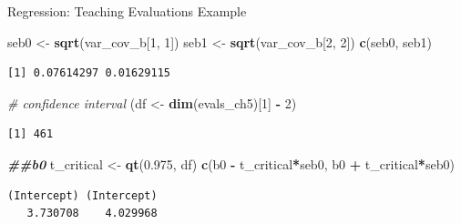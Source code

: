 \documentclass[
  ignorenonframetext,
]{beamer}
\newenvironment{Shaded}{\begin{snugshade}}{\end{snugshade}}
\newcommand{\CommentTok}[1]{\textcolor[rgb]{0.56,0.35,0.01}{\textit{#1}}}
\newcommand{\DecValTok}[1]{\textcolor[rgb]{0.00,0.00,0.81}{#1}}
\newcommand{\DocumentationTok}[1]{\textcolor[rgb]{0.56,0.35,0.01}{\textbf{\textit{#1}}}}
\newcommand{\FloatTok}[1]{\textcolor[rgb]{0.00,0.00,0.81}{#1}}
\newcommand{\FunctionTok}[1]{\textcolor[rgb]{0.13,0.29,0.53}{\textbf{#1}}}
\newcommand{\NormalTok}[1]{#1}
\newcommand{\OtherTok}[1]{\textcolor[rgb]{0.56,0.35,0.01}{#1}}
\newcommand{\SpecialCharTok}[1]{\textcolor[rgb]{0.81,0.36,0.00}{\textbf{#1}}}
\begin{document}
\begin{frame}[fragile]{Regression: Teaching Evaluations Example}
\label{regression-teaching-evaluations-example-11}
\normalsize

\begin{Shaded}
\begin{Highlighting}[]
\NormalTok{seb0 }\OtherTok{\textless{}{-}} \FunctionTok{sqrt}\NormalTok{(var\_cov\_b[}\DecValTok{1}\NormalTok{, }\DecValTok{1}\NormalTok{])}
\NormalTok{seb1 }\OtherTok{\textless{}{-}} \FunctionTok{sqrt}\NormalTok{(var\_cov\_b[}\DecValTok{2}\NormalTok{, }\DecValTok{2}\NormalTok{])}
\FunctionTok{c}\NormalTok{(seb0, seb1)}
\end{Highlighting}
\end{Shaded}

\begin{verbatim}
[1] 0.07614297 0.01629115
\end{verbatim}

\begin{Shaded}
\begin{Highlighting}[]
\CommentTok{\# confidence interval}
\NormalTok{(df }\OtherTok{\textless{}{-}} \FunctionTok{dim}\NormalTok{(evals\_ch5)[}\DecValTok{1}\NormalTok{] }\SpecialCharTok{{-}} \DecValTok{2}\NormalTok{)}
\end{Highlighting}
\end{Shaded}

\begin{verbatim}
[1] 461
\end{verbatim}

\begin{Shaded}
\begin{Highlighting}[]
\DocumentationTok{\#\#b0}
\NormalTok{t\_critical }\OtherTok{\textless{}{-}} \FunctionTok{qt}\NormalTok{(}\FloatTok{0.975}\NormalTok{, df)}
\FunctionTok{c}\NormalTok{(b0 }\SpecialCharTok{{-}}\NormalTok{ t\_critical}\SpecialCharTok{*}\NormalTok{seb0, b0 }\SpecialCharTok{+}\NormalTok{ t\_critical}\SpecialCharTok{*}\NormalTok{seb0)}
\end{Highlighting}
\end{Shaded}

\begin{verbatim}
(Intercept) (Intercept) 
   3.730708    4.029968 
\end{verbatim}

\normalsize
\end{frame}
\end{document}
